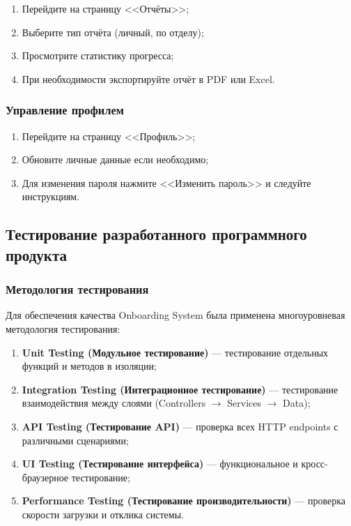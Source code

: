 \begin{enumerate}
    \item Перейдите на страницу <<Отчёты>>;
    \item Выберите тип отчёта (личный, по отделу);
    \item Просмотрите статистику прогресса;
    \item При необходимости экспортируйте отчёт в PDF или Excel.
\end{enumerate}

\subsubsection{Управление профилем}

\begin{enumerate}
    \item Перейдите на страницу <<Профиль>>;
    \item Обновите личные данные если необходимо;
    \item Для изменения пароля нажмите <<Изменить пароль>> и следуйте инструкциям.
\end{enumerate}


\subsection{Тестирование разработанного программного продукта}

\subsubsection{Методология тестирования}

Для обеспечения качества Onboarding System была применена многоуровневая методология тестирования:

\begin{enumerate}
    \item \textbf{Unit Testing (Модульное тестирование)} --- тестирование отдельных функций и методов в изоляции;
    \item \textbf{Integration Testing (Интеграционное тестирование)} --- тестирование взаимодействия между слоями (Controllers $\to$ Services $\to$ Data);
    \item \textbf{API Testing (Тестирование API)} --- проверка всех HTTP endpoints с различными сценариями;
    \item \textbf{UI Testing (Тестирование интерфейса)} --- функциональное и кросс-браузерное тестирование;
    \item \textbf{Performance Testing (Тестирование производительности)} --- проверка скорости загрузки и отклика системы.
\end{enumerate}

